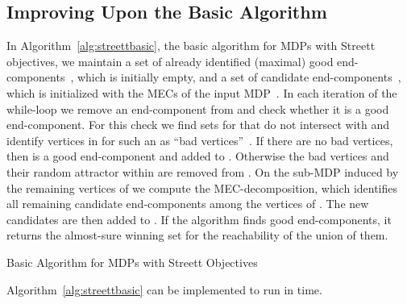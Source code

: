 \documentclass[11pt,letterpaper]{article}
\begin{document}
\subsection{Improving Upon the Basic Algorithm}\label{sec:streettimpr}

In Algorithm~\ref{alg:streettbasic}, the basic algorithm for MDPs with Streett 
objectives, we maintain a set of already identified 
(maximal) good end-components~, which is initially empty, and a set of 
candidate end-components~, which is initialized with the 
MECs of the input MDP~. In each iteration of the while-loop we remove 
an end-component  from  and check whether it is a 
good end-component. For this check we find sets  for  
that do not intersect with  and identify vertices in  for 
such an  as ``bad vertices''~. If there are no bad vertices, then
 is a good end-component and added to . Otherwise the bad 
vertices and their random attractor within  are removed from .
On the sub-MDP induced by the remaining vertices of  we compute the 
MEC-decomposition, which identifies all remaining candidate end-components among
the vertices of . The new candidates are then added to .
If the algorithm finds good end-components, it returns the almost-sure winning set
for the reachability of the union of them.

\begin{algorithm}
	\caption{Basic Algorithm for MDPs with Streett Objectives}
	\label{alg:streettbasic}
	\BlankLine
	\Output
	{
	
	}
	\BlankLine
	\;
	\;
	\Return{}\;
\end{algorithm}

\begin{proposition}\label{prop:timestreetbasic}
	Algorithm~\ref{alg:streettbasic} can be implemented 
	to run in  time.
\end{proposition}
\end{document}
